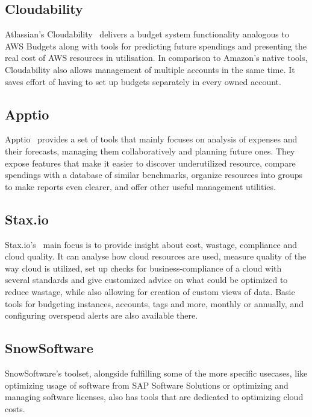 \documentclass[licencjacka,en]{thesisclass}
\begin{document}
    \subsection{Cloudability}

    Atlassian's Cloudability~\cite{Cloudability} delivers
    a budget system functionality analogous to AWS Budgets
    along with tools for predicting future spendings
    and presenting the real cost of AWS resources in utilisation.
    In comparison to Amazon's native tools, Cloudability
    also allows management of multiple accounts in the same time.
    It saves effort of having to set up budgets separately in every owned account.

    \subsection{Apptio}

    Apptio~\cite{Apptio} provides a set of tools that mainly focuses on analysis
    of expenses and their forecasts,
    managing them collaboratively and planning future ones.
    They expose features that make it easier to discover underutilized resource,
    compare spendings with a database of similar benchmarks,
    organize resources into groups to make reports even clearer,
    and offer other useful management utilities.

    \subsection{Stax.io}

    Stax.io's~\cite{Stax.io} main focus is to provide insight about cost,
    wastage, compliance and cloud quality.
    It can analyse how cloud resources are used, measure quality of the way cloud is utilized,
    set up checks for business-compliance of a cloud with several standards
    and give customized advice on what could be optimized to reduce wastage,
    while also allowing for creation of custom views of data.
    Basic tools for budgeting instances, accounts, tags and more, monthly or annually,
    and configuring overspend alerts are also available there.

    \subsection{SnowSoftware}

    SnowSoftware's toolset, alongside fulfilling some of the more specific usecases,
    like optimizing usage of software from SAP Software Solutions or optimizing
    and managing software licenses,
    also has tools that are dedicated to optimizing cloud costs.
\end{document}
